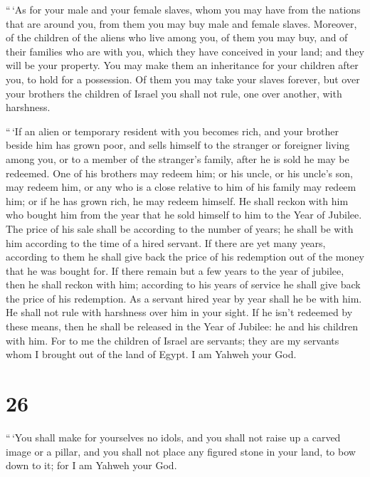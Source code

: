  ``\,`As for your male and your female slaves, whom you may
have from the nations that are around you, from them you may buy male
and female slaves.  Moreover, of the children of the aliens
who live among you, of them you may buy, and of their families who are
with you, which they have conceived in your land; and they will be your
property.  You may make them an inheritance for your
children after you, to hold for a possession. Of them you may take your
slaves forever, but over your brothers the children of Israel you shall
not rule, one over another, with harshness.

 ``\,`If an alien or temporary resident with you becomes
rich, and your brother beside him has grown poor, and sells himself to
the stranger or foreigner living among you, or to a member of the
stranger's family,  after he is sold he may be redeemed.
One of his brothers may redeem him;  or his uncle, or his
uncle's son, may redeem him, or any who is a close relative to him of
his family may redeem him; or if he has grown rich, he may redeem
himself.  He shall reckon with him who bought him from the
year that he sold himself to him to the Year of Jubilee. The price of
his sale shall be according to the number of years; he shall be with him
according to the time of a hired servant.  If there are yet
many years, according to them he shall give back the price of his
redemption out of the money that he was bought for.  If
there remain but a few years to the year of jubilee, then he shall
reckon with him; according to his years of service he shall give back
the price of his redemption.  As a servant hired year by
year shall he be with him. He shall not rule with harshness over him in
your sight.  If he isn't redeemed by these means, then he
shall be released in the Year of Jubilee: he and his children with him.
 For to me the children of Israel are servants; they are my
servants whom I brought out of the land of Egypt. I am Yahweh your God.

\hypertarget{section-25}{%
\section{26}\label{section-25}}

 ``\,`You shall make for yourselves no idols, and you shall
not raise up a carved image or a pillar, and you shall not place any
figured stone in your land, to bow down to it; for I am Yahweh your God.

